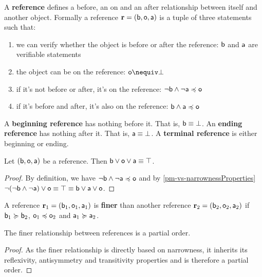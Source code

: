 \begin{mathSection}
	\begin{defn}
		A \textbf{reference} defines a before, an on and an after relationship between itself and another object. Formally a reference $\refStmt = ( \stmt[b], \stmt[o], \stmt[a] )$ is a tuple of three statements such that:
		\begin{enumerate}
			\item we can verify whether the object is before or after the reference: $\stmt[b]$ and $\stmt[a]$ are verifiable statements
			\item the object can be on the reference: $\stmt[o] \nequiv \impossibility$
			\item if it's not before or after, it's on the reference: $\NOT \stmt[b] \AND \NOT \stmt[a] \narrower \stmt[o]$
			\item if it's before and after, it's also on the reference: $\stmt[b] \AND \stmt[a] \narrower \stmt[o]$
		\end{enumerate}
		A \textbf{beginning reference} has nothing before it. That is, $\stmt[b] \equiv \impossibility$. An \textbf{ending reference} has nothing after it. That is, $\stmt[a] \equiv \impossibility$. A \textbf{terminal reference} is either beginning or ending.
	\end{defn}
	\begin{coro}
		Let $(\stmt[b], \stmt[o], \stmt[a])$ be a reference. Then $\stmt[b] \OR \stmt[o] \OR \stmt[a] \equiv \certainty$.
	\end{coro}
	\begin{proof}
		By definition, we have $\NOT \stmt[b] \AND \NOT \stmt[a] \narrower \stmt[o]$ and by \ref{pm-vs-narrownessProperties} $\NOT (\NOT \stmt[b] \AND \NOT \stmt[a]) \OR \stmt[o] \equiv \certainty \equiv \stmt[b] \OR \stmt[a] \OR \stmt[o]$.
	\end{proof}
	\begin{defn}\label{pm-pq-defReference}
		A reference $\refStmt_1 = (\stmt[b]_1, \stmt[o]_1, \stmt[a]_1)$ is \textbf{finer} than another reference $\refStmt_2 = (\stmt[b]_2, \stmt[o]_2, \stmt[a]_2)$ if $\stmt[b]_1 \broader \stmt[b]_2$, $\stmt[o]_1 \narrower \stmt[o]_2$ and $\stmt[a]_1 \broader \stmt[a]_2$.
	\end{defn}
	\begin{coro}
		The finer relationship between references is a partial order.
	\end{coro}
	\begin{proof}
		As the finer relationship is directly based on narrowness, it inherits its reflexivity, antisymmetry and transitivity properties and is therefore a partial order.

\end{proof}
\end{mathSection}
